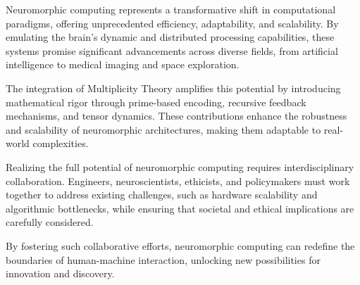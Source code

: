 \documentclass{article}
\theoremstyle{plain}
\begin{document}
Neuromorphic computing represents a transformative shift in computational paradigms, offering unprecedented efficiency, adaptability, and scalability. By emulating the brain's dynamic and distributed processing capabilities, these systems promise significant advancements across diverse fields, from artificial intelligence to medical imaging and space exploration. 

The integration of Multiplicity Theory amplifies this potential by introducing mathematical rigor through prime-based encoding, recursive feedback mechanisms, and tensor dynamics. These contributions enhance the robustness and scalability of neuromorphic architectures, making them adaptable to real-world complexities.

Realizing the full potential of neuromorphic computing requires interdisciplinary collaboration. Engineers, neuroscientists, ethicists, and policymakers must work together to address existing challenges, such as hardware scalability and algorithmic bottlenecks, while ensuring that societal and ethical implications are carefully considered. 

By fostering such collaborative efforts, neuromorphic computing can redefine the boundaries of human-machine interaction, unlocking new possibilities for innovation and discovery.

\nocite{*}


\end{document}
